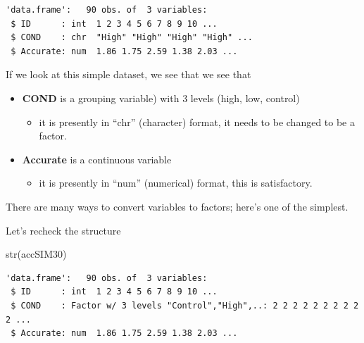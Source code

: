 \documentclass[
  english,
]{book}
\newenvironment{Shaded}{\begin{snugshade}}{\end{snugshade}}
\newcommand{\FunctionTok}[1]{\textcolor[rgb]{0.00,0.00,0.00}{#1}}
\newcommand{\NormalTok}[1]{#1}
\newcommand{\OtherTok}[1]{\textcolor[rgb]{0.56,0.35,0.01}{#1}}
\newcommand{\SpecialCharTok}[1]{\textcolor[rgb]{0.00,0.00,0.00}{#1}}
\providecommand{\tightlist}{%
  \setlength{\itemsep}{0pt}\setlength{\parskip}{0pt}}
\begin{document}
\begin{verbatim}
'data.frame':   90 obs. of  3 variables:
 $ ID      : int  1 2 3 4 5 6 7 8 9 10 ...
 $ COND    : chr  "High" "High" "High" "High" ...
 $ Accurate: num  1.86 1.75 2.59 1.38 2.03 ...
\end{verbatim}

If we look at this simple dataset, we see that we see that

\begin{itemize}
\tightlist
\item
  \textbf{COND} is a grouping variable) with 3 levels (high, low, control)

  \begin{itemize}
  \tightlist
  \item
    it is presently in ``chr'' (character) format, it needs to be changed to be a factor.
  \end{itemize}
\item
  \textbf{Accurate} is a continuous variable

  \begin{itemize}
  \tightlist
  \item
    it is presently in ``num'' (numerical) format, this is satisfactory.
  \end{itemize}
\end{itemize}

There are many ways to convert variables to factors; here's one of the simplest.

\begin{Shaded}
\end{Shaded}

Let's recheck the structure

\begin{Shaded}
\begin{Highlighting}[]
\FunctionTok{str}\NormalTok{(accSIM30)}
\end{Highlighting}
\end{Shaded}

\begin{verbatim}
'data.frame':   90 obs. of  3 variables:
 $ ID      : int  1 2 3 4 5 6 7 8 9 10 ...
 $ COND    : Factor w/ 3 levels "Control","High",..: 2 2 2 2 2 2 2 2 2 2 ...
 $ Accurate: num  1.86 1.75 2.59 1.38 2.03 ...
\end{verbatim}
\end{document}
